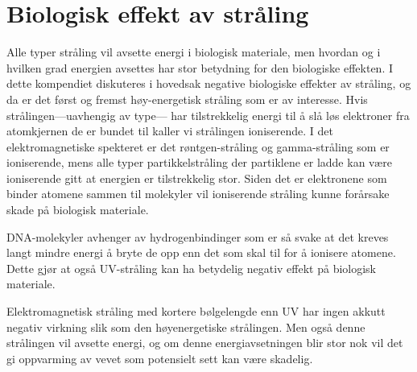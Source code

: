 \documentclass[a4paper,norsk,12pt]{book}
\begin{document}
\section{Biologisk effekt av stråling}
Alle typer stråling vil avsette energi i biologisk materiale, men hvordan og i hvilken grad energien avsettes har stor betydning for den biologiske effekten. I dette kompendiet diskuteres i hovedsak negative biologiske effekter av stråling, og da er det først og fremst høy-energetisk stråling som er av interesse. Hvis strålingen---uavhengig av type--- har tilstrekkelig energi til å slå løs elektroner fra atomkjernen de er bundet til kaller vi strålingen ioniserende. I det elektromagnetiske spekteret er det røntgen-stråling og gamma-stråling som er ioniserende, mens alle typer partikkelstråling der partiklene er ladde kan være ioniserende gitt at energien er tilstrekkelig stor. Siden det er elektronene som binder atomene sammen til molekyler vil ioniserende stråling kunne forårsake skade på biologisk materiale. 

DNA-molekyler avhenger av hydrogenbindinger som er så svake at det kreves langt mindre energi å bryte de opp enn det som skal til for å ionisere atomene. Dette gjør at også UV-stråling kan ha betydelig negativ effekt på biologisk materiale.

Elektromagnetisk stråling med kortere bølgelengde enn UV har ingen akkutt negativ virkning slik som den høyenergetiske strålingen. Men også denne strålingen vil avsette energi, og om denne energiavsetningen blir stor nok vil det gi oppvarming av vevet som potensielt sett kan være skadelig. 







\end{document}
